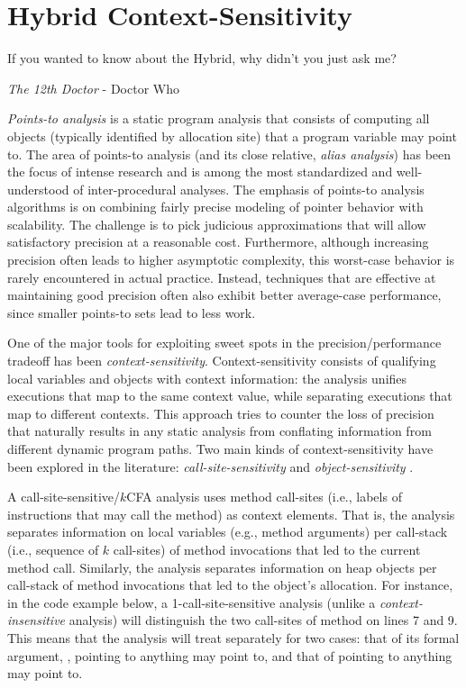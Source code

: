 \chapter{Hybrid Context-Sensitivity}\label{chapter:hybrid}

\epigraph{If you wanted to know about the Hybrid, why didn’t you just ask me?}{\textit{The 12th Doctor} - Doctor Who}





\emph{Points-to analysis} is a static program analysis that consists
of computing all objects (typically identified by allocation site)
that a program variable may point to. The area of points-to analysis
(and its close relative, \emph{alias analysis}) has been the focus of
intense research and is among the most standardized and
well-understood of inter-procedural analyses. The emphasis of
points-to analysis algorithms is on combining fairly precise modeling
of pointer behavior with scalability. The challenge is to pick
judicious approximations that will allow satisfactory precision at a
reasonable cost. Furthermore, although increasing precision often
leads to higher asymptotic complexity, this worst-case behavior is
rarely encountered in actual practice. Instead, techniques that are
effective at maintaining good precision often also exhibit better
average-case performance, since smaller points-to sets lead to less
work.

One of the major tools for exploiting sweet spots in the
precision/performance tradeoff has been \emph{context-sensitivity}.
Context-sensitivity consists of qualifying local variables and objects
with context information: the analysis unifies executions that map to
the same context value, while separating executions that map to
different contexts. This approach tries to counter the loss of
precision that naturally results in any static analysis from
conflating information from different dynamic program paths. Two main
kinds of context-sensitivity have been explored in the literature:
\emph{call-site-sensitivity}
\cite{col:1981:Sharir,thesis:Shivers} and
\emph{object-sensitivity}
\cite{issta:2002:Milanova,article:2005:Milanova,popl:2011:Smaragdakis}.

A call-site-sensitive/$k$CFA analysis uses method call-sites (i.e.,
labels of instructions that may call the method) as context elements.
That is, the analysis separates information on local variables (e.g.,
method arguments) per call-stack (i.e., sequence of $k$ call-sites) of
method invocations that led to the current method call. Similarly, the
analysis separates information on heap objects per call-stack of
method invocations that led to the object's allocation. For instance,
in the code example below, a 1-call-site-sensitive analysis (unlike a
\emph{context-insensitive} analysis) will distinguish the two
call-sites of method  on lines 7 and 9. This means that the
analysis will treat  separately for two cases: that of its
formal argument, , pointing to anything  may point to, and
that of  pointing to anything  may point to.

